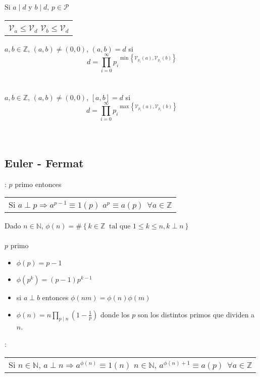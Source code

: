 \documentclass[a4paper,10pt]{article}
\begin{document}
\observacion Si $a \mid d$ y $b \mid d$, $p \in \mathcal{P}$ 
\begin{tabular}{l}
	$\mathcal{V}_{a} \leq \mathcal{V}_{d}$ 
	\cr $\mathcal{V}_{b} \leq \mathcal{V}_{d}$ 
\end{tabular}

 $a,b \in \mathbb{Z}$, $(a,b) \neq (0,0)$, $(a,b) = d$ si 
$$d = \prod_{i=0}^{\infty} {{p_{i}}^{\min \left\lbrace {\mathcal{V}_{p_i}(a)}, {\mathcal{V}_{p_i}(b)} \right\rbrace }}$$ \\ \\

 $a,b \in \mathbb{Z}$, $(a,b) \neq (0,0)$, $[a,b] = d$ si 
$$d = \prod_{i=0}^{\infty} {{p_{i}}^{\max \left\lbrace {\mathcal{V}_{p_i}(a)}, {\mathcal{V}_{p_i}(b)} \right\rbrace }}$$ \\ \\

\subsection{Euler - Fermat}

 
: $p$ primo entonces
\begin{tabular}{l}
	Si $a \perp p \Rightarrow a^{p-1} \equiv 1 (p)$
	\cr $a^{p} \equiv a (p) \ \ \forall a \in \mathbb{Z}$
\end{tabular}

 Dado $n \in \mathbb{N}$, $\phi (n) = \# \left\lbrace k \in \mathbb{Z} \ \mbox{ tal que } 1 \leq k \leq n, k \perp n \right\rbrace$ \\ \\


\propiedades $p$ primo
\begin{itemize}
	\item $\phi(p) = p-1$
	\item $\phi(p^{k}) = (p-1)p^{k-1}$
	\item si $a \perp b$ entonces $\phi(nm) = \phi(n)\phi(m)$
	\item $\displaystyle \phi(n) = n \prod_{p \mid n} { \left(1 - \frac{1}{p}\right)}$ donde los $p$ son los distintos primos que dividen a $n$.
\end{itemize} 

: 
\begin{tabular}{l}
	Si $n \in \mathbb{N}$, $a \perp n \Rightarrow a^{\phi(n)} \equiv 1 (n)$
	\cr $n \in \mathbb{N}$, $a^{\phi(n)+1} \equiv a (p) \ \ \forall a \in \mathbb{Z}$
\end{tabular} \\ \\
\end{document}
